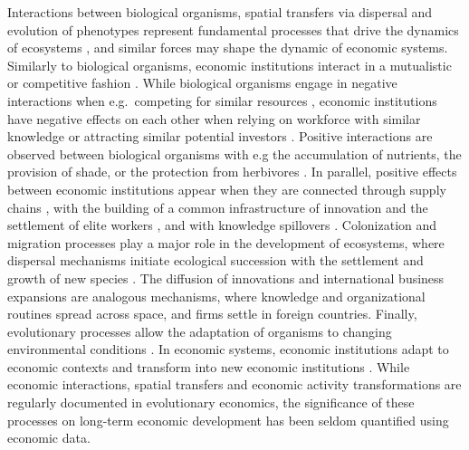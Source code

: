   Interactions between biological organisms, spatial transfers via dispersal and evolution of phenotypes represent fundamental processes that drive the dynamics of ecosystems \citep{Vellend2010}, and similar forces may shape the dynamic of economic systems.
  Similarly to biological organisms, economic institutions interact in a mutualistic or competitive fashion \citep{Pistorius1997}. While biological organisms engage in negative interactions when e.g.~competing for similar resources \citep{GRIME1973}, economic institutions have negative effects on each other when relying on workforce with similar knowledge or attracting similar potential investors \citep{Wernerfelt1989}.
  Positive interactions are observed between biological organisms with e.g the accumulation of nutrients, the provision of shade, or the protection from herbivores \citep{Wernerfelt1989,Callaway2002}. In parallel, positive effects between economic institutions appear when they are connected through supply chains \citep{Ozman2009,Saavedra2009a}, with the building of a common infrastructure of innovation and the settlement of elite workers \citep{Cohendet2018}, and with knowledge spillovers \citep{Menon2015}.
  Colonization and migration processes play a major role in the development of ecosystems, where dispersal mechanisms initiate ecological succession with the settlement and growth of new species \citep{Leibold2004}. The diffusion of innovations \citep{RogersEverettM2003DoI} and international business expansions \citep{Zahra2000} are analogous mechanisms, where knowledge and organizational routines spread across space, and firms settle in foreign countries.
  Finally, evolutionary processes allow the adaptation of organisms to changing environmental conditions \citep{Bell2017}. In economic systems, economic institutions adapt to economic contexts \citep{Cordes2006} and transform into new economic institutions \citep{Freeman2002,Hodgson2004,Aldrich2008}. %
  While economic interactions, spatial transfers and economic activity transformations are regularly documented in evolutionary economics, the significance of these processes on long-term economic development has been seldom quantified using economic data.%

